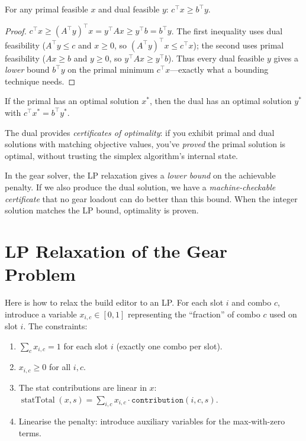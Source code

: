 \documentclass[11pt, a4paper, oneside]{book}
\newcommand{\statTotal}{\operatorname{statTotal}}
\begin{document}
\begin{thmbox}[title={Weak Duality}]
For any primal feasible $x$ and dual feasible $y$:
$c^\top x \geq b^\top y$.
\end{thmbox}

\begin{proof}
$c^\top x \geq (A^\top y)^\top x = y^\top A x \geq y^\top b = b^\top y$.
The first inequality uses dual feasibility ($A^\top y \leq c$ and $x \geq 0$, so
$(A^\top y)^\top x \leq c^\top x$); the second uses primal feasibility
($Ax \geq b$ and $y \geq 0$, so $y^\top A x \geq y^\top b$).  Thus every dual
feasible $y$ gives a \emph{lower} bound $b^\top y$ on the primal minimum
$c^\top x$---exactly what a bounding technique needs.
\end{proof}

\begin{thmbox}[title={Strong Duality}]
If the primal has an optimal solution $x^*$, then the dual has an optimal
solution $y^*$ with $c^\top x^* = b^\top y^*$.
\end{thmbox}

The dual provides \emph{certificates of optimality}: if you exhibit primal and
dual solutions with matching objective values, you've \emph{proved} the primal
solution is optimal, without trusting the simplex algorithm's internal state.

\begin{intuitionbox}
In the gear solver, the LP relaxation gives a \emph{lower bound} on the
achievable penalty.  If we also produce the dual solution, we have a
\emph{machine-checkable certificate} that no gear loadout can do better
than this bound.  When the integer solution matches the LP bound,
optimality is proven.
\end{intuitionbox}

\section{LP Relaxation of the Gear Problem}

Here is how to relax the build editor to an LP.  For each slot $i$ and
combo $c$, introduce a variable $x_{i,c} \in [0, 1]$ representing the
``fraction'' of combo $c$ used on slot $i$.  The constraints:

\begin{enumerate}[nosep]
  \item $\sum_c x_{i,c} = 1$ for each slot $i$ (exactly one combo per slot).
  \item $x_{i,c} \geq 0$ for all $i, c$.
  \item The stat contributions are linear in $x$:
    $\statTotal(x, s) = \sum_{i,c} x_{i,c} \cdot \texttt{contribution}(i, c, s)$.
  \item Linearise the penalty: introduce auxiliary variables for the
    max-with-zero terms.
\end{enumerate}
\end{document}
